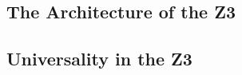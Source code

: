 \documentclass[Master.tex]{subfiles}
\begin{document}
\subsection{The Architecture of the Z3}

\subsection{Universality in the Z3}

\subsubsection{}
\end{document}
